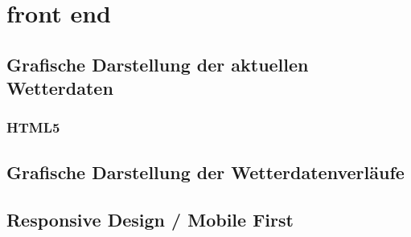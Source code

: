 \section{front end}


\subsection{Grafische Darstellung der aktuellen Wetterdaten}

\subsubsection*{HTML5}





\subsection{Grafische Darstellung der Wetterdatenverläufe}




\subsection{Responsive Design / Mobile First}



